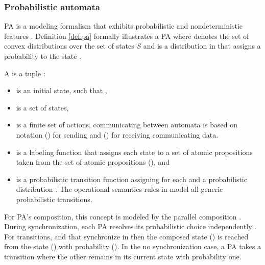 \subsubsection{Probabilistic automata}
\label{sec:pa}


PA \cite{ref27} is a modeling formalism that exhibits probabilistic and nondeterministic features . Definition \ref{def:pa} formally illustrates a PA where  denotes the set of convex distributions over the set of states $S$ and \emath{\mu} is a distribution in  that assigns a probability  to the state .

\begin{mydef} \label{def:pa} \normalfont  A  is a tuple :
\label{ts}
\begin{itemize}
	\item {} is an initial state, such that ,
 
	\item {} is a set of states,

	\item \emath{\Sigma}  is a finite set of actions, communicating between automata is based on notation (\emath{!}) for sending and () for receiving communicating data.

 	\item {} is a labeling function that assigns each state   to a set of atomic propositions taken from the set of atomic propositions (), and

    \item {} is a probabilistic transition function assigning for each  and \emath{\alpha \in \Sigma } a probabilistic distribution . The operational semantics rules in  model all generic probabilistic transitions.
\end{itemize}
\end{mydef}


For PA's composition, this concept is modeled by the parallel composition \cite{ref27}. During synchronization, each PA resolves its probabilistic choice independently \cite{ref27}. For transitions,   and  that synchronize in \emath{\alpha} then the composed state () is reached from the state () with probability ().  In the no synchronization case, a PA takes a transition where the other remains in its current state with probability one.


